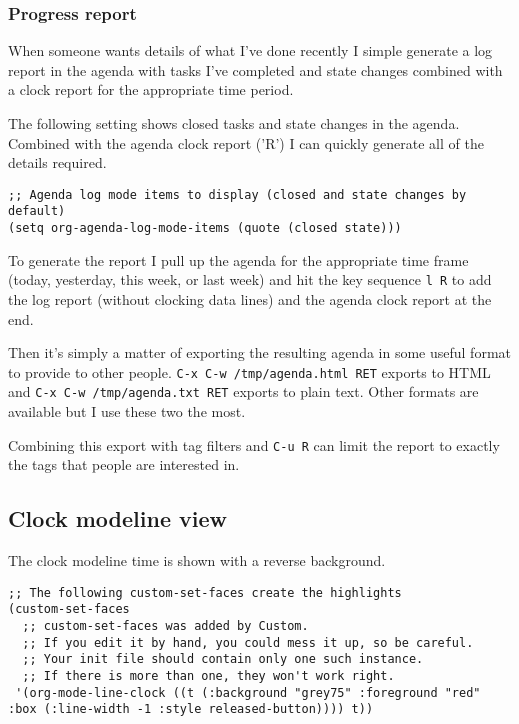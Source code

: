 \documentclass[11pt]{scrartcl}
\begin{document}
\subsubsection{Progress report}
\label{sec:orgheadline28}

When someone wants details of what I've done recently I simple generate a
log report in the agenda with tasks I've completed and state changes combined
with a clock report for the appropriate time period.

The following setting shows closed tasks and state changes in the
agenda.  Combined with the agenda clock report ('R') I can quickly
generate all of the details required.

\begin{verbatim}
;; Agenda log mode items to display (closed and state changes by default)
(setq org-agenda-log-mode-items (quote (closed state)))
\end{verbatim}

To generate the report I pull up the agenda for the appropriate time frame
(today, yesterday, this week, or last week) and hit the key sequence
\texttt{l R} to add the log report (without clocking data lines) and the agenda clock
report at the end.

Then it's simply a matter of exporting the resulting agenda in some useful format
to provide to other people.  \texttt{C-x C-w /tmp/agenda.html RET} exports to HTML
and \texttt{C-x C-w /tmp/agenda.txt RET} exports to plain text.  Other formats are
available but I use these two the most.

Combining this export with tag filters and \texttt{C-u R} can limit the
report to exactly the tags that people are interested in.

\subsection{Clock modeline view}
\label{sec:orgheadline30}

The clock modeline time is shown with a reverse background.

\begin{verbatim}
;; The following custom-set-faces create the highlights
(custom-set-faces
  ;; custom-set-faces was added by Custom.
  ;; If you edit it by hand, you could mess it up, so be careful.
  ;; Your init file should contain only one such instance.
  ;; If there is more than one, they won't work right.
 '(org-mode-line-clock ((t (:background "grey75" :foreground "red" :box (:line-width -1 :style released-button)))) t))
\end{verbatim}
\end{document}
